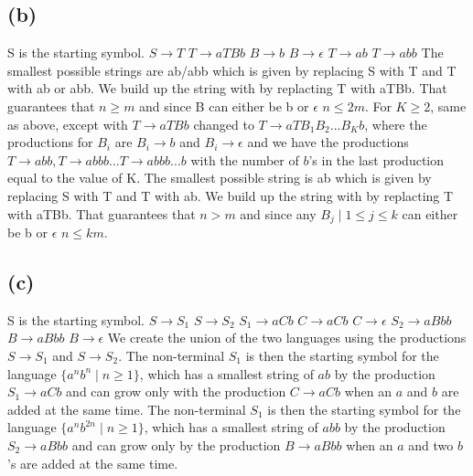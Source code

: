 \documentclass[12pt]{article}
\begin{document}
\subsection*{(b)} S is the starting symbol.
\newline
$S \rightarrow T$ \newline
$T \rightarrow aTBb$ \newline
$B \rightarrow b$ \newline
$B \rightarrow \epsilon$ \newline
$T \rightarrow ab$ \newline
$T \rightarrow abb$ \newline
The smallest possible strings are ab/abb which is given by replacing S with T
and T with ab or abb. We build up the string with by replacting T with aTBb.
That guarantees that $n \ge m$ and since B can either be b or $\epsilon$
$n \le 2m$. For $K \ge 2$, same as above, except with $T \rightarrow aTBb$
changed to $T \rightarrow aTB_1B_2...B_Kb$, where the productions for $B_i$ are
$B_i \rightarrow b$ and $B_i \rightarrow \epsilon$ and we have the productions
$T \rightarrow abb, T \rightarrow abbb ... T \rightarrow abbb...b$ with the
number of $b$'s in the last production equal to the value of K. The smallest
possible string is ab which is given by replacing S with T and T with ab.
We build up the string with by replacting T with aTBb. That guarantees that
$n > m$ and since any $B_j \mid 1 \le j \le k$ can either be b or
$\epsilon$ $n \le km$.

\subsection*{(c)} S is the starting symbol.
\newline
$S \rightarrow S_1$ \newline
$S \rightarrow S_2$ \newline
$S_1 \rightarrow aCb$ \newline
$C \rightarrow aCb$ \newline
$C \rightarrow \epsilon $ \newline
$S_2 \rightarrow aBbb$ \newline
$B \rightarrow aBbb$ \newline
$B \rightarrow \epsilon $ \newline
We create the union of the two languages using the productions
$S \rightarrow S_1$ and $S \rightarrow S_2$. The non-terminal $S_1$ is then the
starting symbol for the language $\{a^{n}b^{n}\mid n \geq 1\}$, which has a
smallest string of $ab$ by the production $S_1 \rightarrow aCb$ and can grow
only with the production $C \rightarrow aCb$ when an $a$ and $b$ are added at
the same time. The non-terminal $S_1$ is then the starting symbol for the
language $\{a^{n}b^{2n}\mid n \geq 1\}$, which has a smallest string of $abb$
by the production $S_2 \rightarrow aBbb$ and can grow only by the production
$B \rightarrow aBbb$ when an $a$ and two $b$'s are added at the same time.
\end{document}
